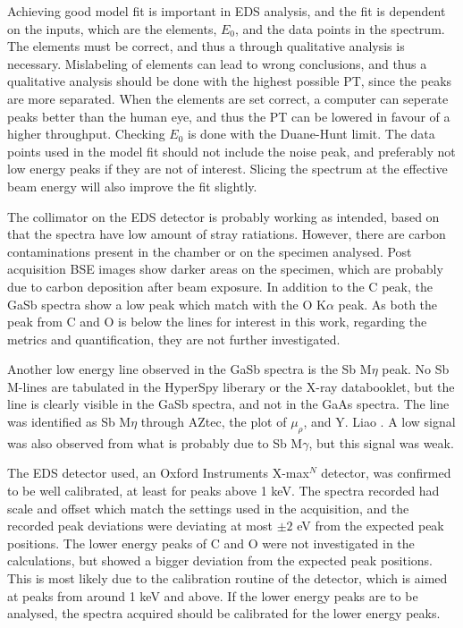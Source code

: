 Achieving good model fit is important in EDS analysis, and the fit is dependent on the inputs, which are the elements, $E_0$, and the data points in the spectrum.
The elements must be correct, and thus a through qualitative analysis is necessary.
Mislabeling of elements can lead to wrong conclusions, and thus a qualitative analysis should be done with the highest possible PT, since the peaks are more separated.
When the elements are set correct, a computer can seperate peaks better than the human eye, and thus the PT can be lowered in favour of a higher throughput.
Checking $E_0$ is done with the Duane-Hunt limit.
The data points used in the model fit should not include the noise peak, and preferably not low energy peaks if they are not of interest.
Slicing the spectrum at the effective beam energy will also improve the fit slightly.



The collimator on the EDS detector is probably working as intended, based on that the spectra have low amount of stray ratiations.
However, there are carbon contaminations present in the chamber or on the specimen analysed.
Post acquisition BSE images show darker areas on the specimen, which are probably due to carbon deposition after beam exposure.
In addition to the C peak, the GaSb spectra show a low peak which match with the O K$\alpha$ peak.
As both the peak from C and O is below the lines for interest in this work, regarding the metrics and quantification, they are not further investigated.

Another low energy line observed in the GaSb spectra is the Sb M$\eta$ peak.
No Sb M-lines are tabulated in the HyperSpy liberary or the X-ray databooklet, but the line is clearly visible in the GaSb spectra, and not in the GaAs spectra.
The line was identified as Sb M$\eta$ through AZtec, the plot of $\mu_\rho$, and Y. Liao \cite{liao2006practical}.
A low signal was also observed from what is probably due to Sb M$\gamma$, but this signal was weak.

The EDS detector used, an Oxford Instruments X-max$^N$ detector, was confirmed to be well calibrated, at least for peaks above 1 keV.
The spectra recorded had scale and offset which match the settings used in the acquisition, and the recorded peak deviations were deviating at most $\pm 2$ eV from the expected peak positions.
The lower energy peaks of C and O were not investigated in the calculations, but showed a bigger deviation from the expected peak positions.
This is most likely due to the calibration routine of the detector, which is aimed at peaks from around 1 keV and above.
If the lower energy peaks are to be analysed, the spectra acquired should be calibrated for the lower energy peaks.


